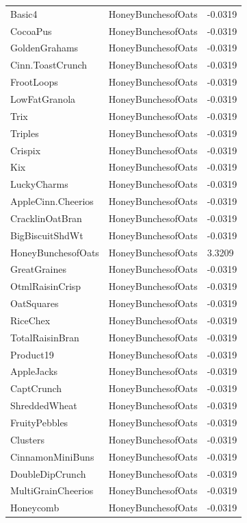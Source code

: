 \begin{table}[!htbp]
\begin{tabular}{lll}
\\
Basic4 & HoneyBunchesofOats & -0.0319
\\
CocoaPus & HoneyBunchesofOats & -0.0319
\\
GoldenGrahams & HoneyBunchesofOats & -0.0319
\\
Cinn.ToastCrunch & HoneyBunchesofOats & -0.0319
\\
FrootLoops & HoneyBunchesofOats & -0.0319
\\
LowFatGranola & HoneyBunchesofOats & -0.0319
\\
Trix & HoneyBunchesofOats & -0.0319
\\
Triples & HoneyBunchesofOats & -0.0319
\\
Crispix & HoneyBunchesofOats & -0.0319
\\
Kix & HoneyBunchesofOats & -0.0319
\\
LuckyCharms & HoneyBunchesofOats & -0.0319
\\
AppleCinn.Cheerios & HoneyBunchesofOats & -0.0319
\\
CracklinOatBran & HoneyBunchesofOats & -0.0319
\\
BigBiscuitShdWt & HoneyBunchesofOats & -0.0319
\\
HoneyBunchesofOats & HoneyBunchesofOats & 3.3209
\\
GreatGraines & HoneyBunchesofOats & -0.0319
\\
OtmlRaisinCrisp & HoneyBunchesofOats & -0.0319
\\
OatSquares & HoneyBunchesofOats & -0.0319
\\
RiceChex & HoneyBunchesofOats & -0.0319
\\
TotalRaisinBran & HoneyBunchesofOats & -0.0319
\\
Product19 & HoneyBunchesofOats & -0.0319
\\
AppleJacks & HoneyBunchesofOats & -0.0319
\\
CaptCrunch & HoneyBunchesofOats & -0.0319
\\
ShreddedWheat & HoneyBunchesofOats & -0.0319
\\
FruityPebbles & HoneyBunchesofOats & -0.0319
\\
Clusters & HoneyBunchesofOats & -0.0319
\\
CinnamonMiniBuns & HoneyBunchesofOats & -0.0319
\\
DoubleDipCrunch & HoneyBunchesofOats & -0.0319
\\
MultiGrainCheerios & HoneyBunchesofOats & -0.0319
\\
Honeycomb & HoneyBunchesofOats & -0.0319
\\

\end{tabular}
\end{table}
